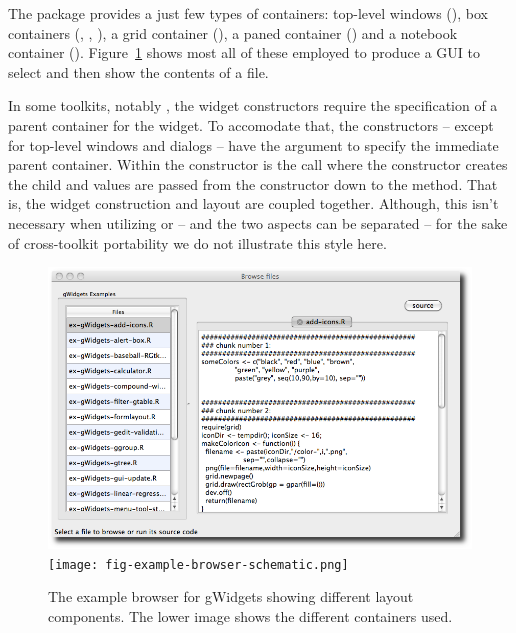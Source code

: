 The  package provides a just few types of containers:
top-level windows (), box containers (,
, ), a grid container
(), a paned container () and a
notebook container
(). Figure~\ref{fig:gWidgets-sample-layout} shows most
all of these employed to produce a GUI to select and then show the
contents of a file.


In some toolkits, notably , the widget constructors require
the specification of a parent container for the widget. To accomodate
that, the  constructors -- except for top-level windows
and dialogs -- have the argument  to specify the
immediate parent container.  Within the constructor is the call
 where the constructor creates the
child and   values are passed from the constructor down to
the  method.  That is, the widget construction and layout
are coupled together. Although, this isn't necessary when utilizing
 or  -- and the two aspects can be separated --
for the sake of cross-toolkit portability we do not illustrate this
style here.



\begin{figure}
  \centering
  \includegraphics[width=.9\textwidth]{fig-gWidgets-example-browser}
  \\
  
  \texttt{[image: fig-example-browser-schematic.png]}
  \caption{The example browser for gWidgets showing different layout
    components. The lower image shows the different containers used.}
  \label{fig:gWidgets-sample-layout}
\end{figure}



